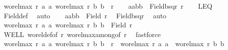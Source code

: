 \begin{isabellebody}
\ {\isachardoublequoteopen}{\isacharparenleft}{\kern0pt}wo{\isacharunderscore}{\kern0pt}rel{\isachardot}{\kern0pt}max{}\ r\ a{}\ a{}{\isacharcomma}{\kern0pt}\ wo{\isacharunderscore}{\kern0pt}rel{\isachardot}{\kern0pt}max{}\ r\ b{}\ b{}{\isacharparenright}{\kern0pt}\ {\isasymin}\ r{\isachardoublequoteclose}\isanewline
%
\isadelimproof
%
\endisadelimproof
%
\isatagproof
{}\isamarkupfalse%
{\isacharminus}{\kern0pt}\isanewline
\ \ \isamarkupfalse%
\ {\isachardoublequoteopen}{\isacharbraceleft}{\kern0pt}{\isacharparenleft}{\kern0pt}a{}{\isacharcomma}{\kern0pt}a{}{\isacharparenright}{\kern0pt}{\isacharcomma}{\kern0pt}{\isacharparenleft}{\kern0pt}b{}{\isacharcomma}{\kern0pt}b{}{\isacharparenright}{\kern0pt}{\isacharbraceright}{\kern0pt}\ {\isasymle}\ Field{\isacharparenleft}{\kern0pt}bsqr\ r{\isacharparenright}{\kern0pt}{\isachardoublequoteclose}\isanewline
\ \ \isamarkupfalse%
\ LEQ\ \isamarkupfalse%
\ Field{\isacharunderscore}{\kern0pt}def\ \isamarkupfalse%
\ auto\isanewline
\ \ \isamarkupfalse%
\ {\isachardoublequoteopen}{\isacharbraceleft}{\kern0pt}a{}{\isacharcomma}{\kern0pt}a{}{\isacharcomma}{\kern0pt}b{}{\isacharcomma}{\kern0pt}b{}{\isacharbraceright}{\kern0pt}\ {\isasymle}\ Field\ r{\isachardoublequoteclose}\ \isamarkupfalse%
\ Field{\isacharunderscore}{\kern0pt}bsqr\ \isamarkupfalse%
\ auto\isanewline
\ \ \isamarkupfalse%
\ {\isachardoublequoteopen}{\isacharbraceleft}{\kern0pt}wo{\isacharunderscore}{\kern0pt}rel{\isachardot}{\kern0pt}max{}\ r\ a{}\ a{}{\isacharcomma}{\kern0pt}\ wo{\isacharunderscore}{\kern0pt}rel{\isachardot}{\kern0pt}max{}\ r\ b{}\ b{}{\isacharbraceright}{\kern0pt}\ {\isasymle}\ Field\ r{\isachardoublequoteclose}\isanewline
\ \ \isamarkupfalse%
\ WELL\ wo{\isacharunderscore}{\kern0pt}rel{\isacharunderscore}{\kern0pt}def{\isacharbrackleft}{\kern0pt}of\ r{\isacharbrackright}{\kern0pt}\ wo{\isacharunderscore}{\kern0pt}rel{\isachardot}{\kern0pt}max{}{\isacharunderscore}{\kern0pt}among{\isacharbrackleft}{\kern0pt}of\ r{\isacharbrackright}{\kern0pt}\ \isamarkupfalse%
\ fastforce\isanewline
\ \ \isamarkupfalse%
\ \isamarkupfalse%
\ {\isachardoublequoteopen}{\isacharparenleft}{\kern0pt}wo{\isacharunderscore}{\kern0pt}rel{\isachardot}{\kern0pt}max{}\ r\ a{}\ a{}{\isacharcomma}{\kern0pt}\ wo{\isacharunderscore}{\kern0pt}rel{\isachardot}{\kern0pt}max{}\ r\ b{}\ b{}{\isacharparenright}{\kern0pt}\ {\isasymin}\ r\ {\isasymor}\ wo{\isacharunderscore}{\kern0pt}rel{\isachardot}{\kern0pt}max{}\ r\ a{}\ a{}\ {\isacharequal}{\kern0pt}\ wo{\isacharunderscore}{\kern0pt}rel{\isachardot}{\kern0pt}max{}\ r\ b{}\ b{}{\isachardoublequoteclose}\isanewline

\end{isabellebody}
